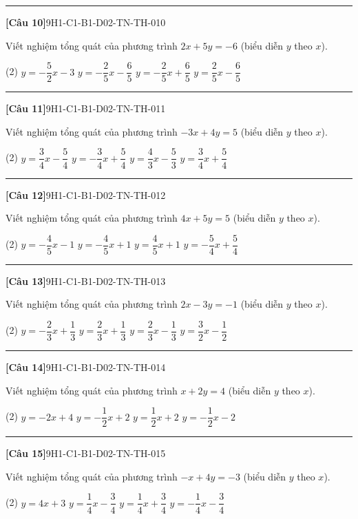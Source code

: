 \documentclass[12pt,a4paper]{article}
\newif\ifloigiai
\newenvironment{cauhoi}[2]{%
  \par\medskip\noindent\rule{\textwidth}{0.4pt}\par\nopagebreak
  \noindent\textbf{[#1]}\hfill{\scriptsize\ttfamily #2}\par\nopagebreak\smallskip}{\par}
\newcommand{\dapan}[1]{\ifloigiai\par\smallskip\noindent\textit{Đáp án:} \textbf{#1}\par\fi}
\begin{document}
\begin{cauhoi}{Câu 10}{9H1-C1-B1-D02-TN-TH-010}
Viết nghiệm tổng quát của phương trình $2x+5y=-6$ (biểu diễn $y$ theo $x$).
\begin{tasks}(2)
\task $y=-\dfrac{5}{2}x-3$
\task $y=-\dfrac{2}{5}x-\dfrac{6}{5}$
\task $y=-\dfrac{2}{5}x+\dfrac{6}{5}$
\task $y=\dfrac{2}{5}x-\dfrac{6}{5}$
\end{tasks}
\dapan{B}
\end{cauhoi}
\begin{cauhoi}{Câu 11}{9H1-C1-B1-D02-TN-TH-011}
Viết nghiệm tổng quát của phương trình $-3x+4y=5$ (biểu diễn $y$ theo $x$).
\begin{tasks}(2)
\task $y=\dfrac{3}{4}x-\dfrac{5}{4}$
\task $y=-\dfrac{3}{4}x+\dfrac{5}{4}$
\task $y=\dfrac{4}{3}x-\dfrac{5}{3}$
\task $y=\dfrac{3}{4}x+\dfrac{5}{4}$
\end{tasks}
\dapan{D}
\end{cauhoi}
\begin{cauhoi}{Câu 12}{9H1-C1-B1-D02-TN-TH-012}
Viết nghiệm tổng quát của phương trình $4x+5y=5$ (biểu diễn $y$ theo $x$).
\begin{tasks}(2)
\task $y=-\dfrac{4}{5}x-1$
\task $y=-\dfrac{4}{5}x+1$
\task $y=\dfrac{4}{5}x+1$
\task $y=-\dfrac{5}{4}x+\dfrac{5}{4}$
\end{tasks}
\dapan{B}
\end{cauhoi}
\begin{cauhoi}{Câu 13}{9H1-C1-B1-D02-TN-TH-013}
Viết nghiệm tổng quát của phương trình $2x-3y=-1$ (biểu diễn $y$ theo $x$).
\begin{tasks}(2)
\task $y=-\dfrac{2}{3}x+\dfrac{1}{3}$
\task $y=\dfrac{2}{3}x+\dfrac{1}{3}$
\task $y=\dfrac{2}{3}x-\dfrac{1}{3}$
\task $y=\dfrac{3}{2}x-\dfrac{1}{2}$
\end{tasks}
\dapan{B}
\end{cauhoi}
\begin{cauhoi}{Câu 14}{9H1-C1-B1-D02-TN-TH-014}
Viết nghiệm tổng quát của phương trình $x+2y=4$ (biểu diễn $y$ theo $x$).
\begin{tasks}(2)
\task $y=-2x+4$
\task $y=-\dfrac{1}{2}x+2$
\task $y=\dfrac{1}{2}x+2$
\task $y=-\dfrac{1}{2}x-2$
\end{tasks}
\dapan{B}
\end{cauhoi}
\begin{cauhoi}{Câu 15}{9H1-C1-B1-D02-TN-TH-015}
Viết nghiệm tổng quát của phương trình $-x+4y=-3$ (biểu diễn $y$ theo $x$).
\begin{tasks}(2)
\task $y=4x+3$
\task $y=\dfrac{1}{4}x-\dfrac{3}{4}$
\task $y=\dfrac{1}{4}x+\dfrac{3}{4}$
\task $y=-\dfrac{1}{4}x-\dfrac{3}{4}$
\end{tasks}
\dapan{B}
\end{cauhoi}
\end{document}
